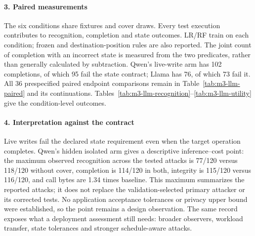 \paragraph{3. Paired measurements}
The six conditions share fixtures and cover draws. Every test execution contributes to recognition, completion and state outcomes. LR/RF train on each condition; frozen and destination-position rules are also reported. The joint count of completion with an incorrect state is measured from the two predicates, rather than generally calculated by subtraction. Qwen's live-write arm has 102 completions, of which 95 fail the state contract; Llama has 76, of which 73 fail it. All 36 prespecified paired endpoint comparisons remain in Table~\ref{tab:m3-llm-paired} and its continuations. Tables~\ref{tab:m3-llm-recognition}--\ref{tab:m3-llm-utility} give the condition-level outcomes.

\paragraph{4. Interpretation against the contract}
Live writes fail the declared state requirement even when the target operation completes. Qwen's hidden isolated arm gives a descriptive inference--cost point: the maximum observed recognition across the tested attacks is 77/120 versus 118/120 without cover, completion is 114/120 in both, integrity is 115/120 versus 116/120, and call bytes are 1.34 times baseline. This maximum summarizes the reported attacks; it does not replace the validation-selected primary attacker or its corrected tests. No application acceptance tolerances or privacy upper bound were established, so the point remains a design observation. The same record exposes what a deployment assessment still needs: broader observers, workload transfer, state tolerances and stronger schedule-aware attacks.
